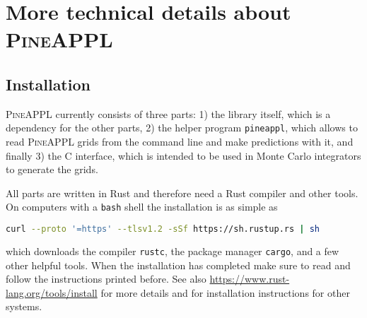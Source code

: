 \section{More technical details about \texorpdfstring{\textsc{PineAPPL}}{PineAPPL}}

%

\subsection{Installation}
\label{app:installation}

\textsc{PineAPPL} currently consists of three parts: 1) the library itself, which is a dependency for the other parts, 2) the helper program \texttt{pineappl}, which allows to read \textsc{PineAPPL} grids from the command line and make predictions with it, and finally 3) the C interface, which is intended to be used in Monte Carlo integrators to generate the grids.


All parts are written in Rust and therefore need a Rust compiler and other tools.
On computers with a \texttt{bash} shell the installation is as simple as
\begin{lstlisting}[language=bash]
curl --proto '=https' --tlsv1.2 -sSf https://sh.rustup.rs | sh
\end{lstlisting}
which downloads the compiler \texttt{rustc}, the package manager \texttt{cargo}, and a few other helpful tools.
When the installation has completed make sure to read and follow the instructions printed before.
See also \url{https://www.rust-lang.org/tools/install} for more details and for installation instructions for other systems.

